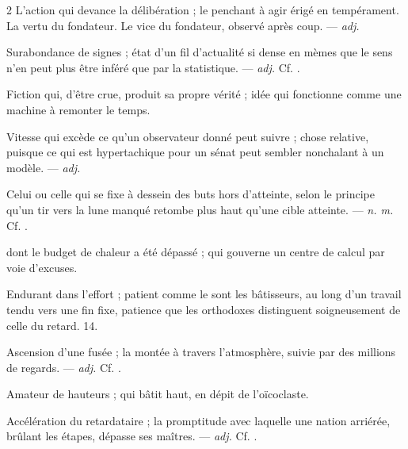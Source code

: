 \begin{multicols}{2}
 L'action qui devance la délibération ; le penchant à agir érigé en tempérament.   La vertu du fondateur.   Le vice du fondateur, observé après coup. —  \textit{adj.}

 Surabondance de signes ; état d'un fil d'actualité si dense en mèmes que le sens n'en peut plus être inféré que par la statistique. —  \textit{adj.} Cf. .

 Fiction qui, d'être crue, produit sa propre vérité ; idée qui fonctionne comme une machine à remonter le temps.

 Vitesse qui excède ce qu'un observateur donné peut suivre ; chose relative, puisque ce qui est hypertachique pour un sénat peut sembler nonchalant à un modèle. —  \textit{adj.}

 Celui ou celle qui se fixe à dessein des buts hors d'atteinte, selon le principe qu'un tir vers la lune manqué retombe plus haut qu'une cible atteinte. —  \textit{n. m.} Cf. .

   dont le budget de chaleur a été dépassé ; qui gouverne un centre de calcul par voie d'excuses.

 Endurant dans l'effort ; patient comme le sont les bâtisseurs, au long d'un travail tendu vers une fin fixe, patience que les orthodoxes distinguent soigneusement de celle du retard.   14.

 Ascension d'une fusée ; la montée à travers l'atmosphère, suivie par des millions de regards.  —  \textit{adj.} Cf. .

 Amateur de hauteurs ; qui bâtit haut, en dépit de l'oïcoclaste.

 Accélération du retardataire ; la promptitude avec laquelle une nation arriérée, brûlant les étapes, dépasse ses maîtres. —  \textit{adj.} Cf. .

\end{multicols}

